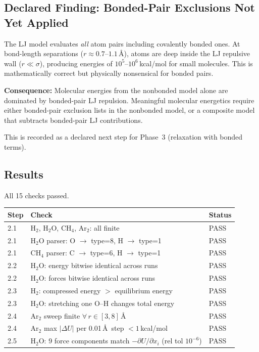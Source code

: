 \documentclass[11pt]{article}
\begin{document}
\subsection{Declared Finding: Bonded-Pair Exclusions Not Yet Applied}

The LJ model evaluates \emph{all} atom pairs including covalently bonded
ones.  At bond-length separations ($r \approx 0.7$--$1.1$\,\AA), atoms are
deep inside the LJ repulsive wall ($r \ll \sigma$), producing energies of
$10^5$--$10^6$\,kcal/mol for small molecules.  This is mathematically
correct but physically nonsensical for bonded pairs.

\textbf{Consequence:} Molecular energies from the nonbonded model alone
are dominated by bonded-pair LJ repulsion.  Meaningful molecular energetics
require either bonded-pair exclusion lists in the nonbonded model, or a
composite model that subtracts bonded-pair LJ contributions.

This is recorded as a declared next step for Phase~3 (relaxation with
bonded terms).

\subsection{Results}

All 15 checks passed.

\begin{center}
\begin{tabular}{lll}
\toprule
Step & Check & Status \\
\midrule
2.1 & H$_2$, H$_2$O, CH$_4$, Ar$_2$: all finite & PASS \\
2.1 & H$_2$O parser: O $\to$ type=8, H $\to$ type=1 & PASS \\
2.1 & CH$_4$ parser: C $\to$ type=6, H $\to$ type=1 & PASS \\
\midrule
2.2 & H$_2$O: energy bitwise identical across runs & PASS \\
2.2 & H$_2$O: forces bitwise identical across runs & PASS \\
\midrule
2.3 & H$_2$: compressed energy $>$ equilibrium energy & PASS \\
2.3 & H$_2$O: stretching one O--H changes total energy & PASS \\
\midrule
2.4 & Ar$_2$ sweep finite $\forall\, r \in [3,8]$\,\AA & PASS \\
2.4 & Ar$_2$ max $|\Delta U|$ per 0.01\,\AA\ step $< 1$\,kcal/mol & PASS \\
\midrule
2.5 & H$_2$O: 9 force components match $-\partial U/\partial x_i$ (rel tol $10^{-6}$) & PASS \\
\bottomrule
\end{tabular}
\end{center}
\end{document}
